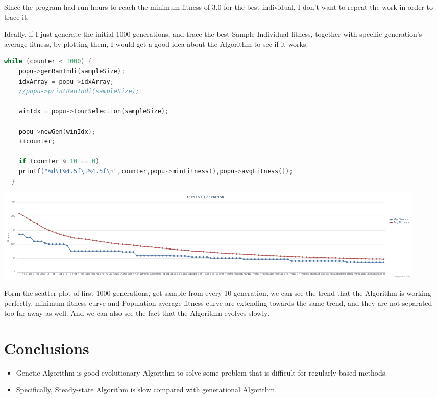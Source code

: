 \documentclass{article}
\begin{document}
\begin{CJK}{UTF8}{gbsn}
Since the program had run hours to reach the minimum fitness of 3.0 for the best individual, I don't want to repeat the work in order to trace it. 

Ideally, if I just generate the initial 1000 generations, and trace the best Sample Individual fitness, together with specific generation's average fitness, by plotting them, I would get a good idea about the Algorithm to see if it works. 
\begin{lstlisting}[language=c++]
  while (counter < 1000) {
    popu->genRanIndi(sampleSize);
    idxArray = popu->idxArray;
    //popu->printRanIndi(sampleSize);
    
    winIdx = popu->tourSelection(sampleSize);

    popu->newGen(winIdx);
    ++counter;

    if (counter % 10 == 0)
    printf("%d\t%4.5f\t%4.5f\n",counter,popu->minFitness(),popu->avgFitness());
  }
\end{lstlisting}

\includegraphics[width=\textwidth]{chart}

Form the scatter plot of first 1000 generations, get sample from every 10 generation, we can see the trend that the Algorithm is working perfectly. minimum fitness curve and Population average fitness curve are extending towards the same trend, and they are not separated too far away as well. And we can also see the fact that the Algorithm evolves slowly. 

\section{Conclusions}
\begin{itemize}
\itemsep=-3pt
\item Genetic Algorithm is good evolutionary Algorithm to solve some problem that is difficult for regularly-based methods.
\item Specifically, Steady-state Algorithm is slow compared with generational Algorithm. 
\end{itemize}


\end{CJK}
\end{document}
